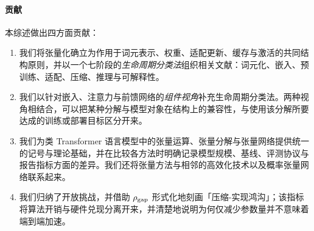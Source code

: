 \documentclass[11pt]{article}
\begin{document}
\paragraph{贡献}
本综述做出四方面贡献：
\begin{enumerate}[leftmargin=*]
  \item 我们将张量化确立为作用于词元表示、权重、适配更新、缓存与激活的共同结构原则，并以一个七阶段的\emph{生命周期分类法}组织相关文献：词元化、嵌入、预训练、适配、压缩、推理与可解释性。
  \item 我们以针对嵌入、注意力与前馈网络的\emph{组件视角}补充生命周期分类法。两种视角相结合，可以把某种分解与模型对象在结构上的兼容性，与使用该分解所要达成的训练或部署目标区分开来。
  \item 我们为类 Transformer 语言模型中的张量运算、张量分解与张量网络提供统一的记号与理论基础，并在比较各方法时明确记录模型规模、基线、评测协议与报告指标方面的差异。我们还将张量方法与相邻的高效化技术以及概率张量网络联系起来。
  \item 我们归纳了开放挑战，并借助 $\rho_{\rm gap}$ 形式化地刻画「压缩-实现鸿沟」；该指标将算法开销与硬件兑现分离开来，并清楚地说明为何仅减少参数量并不意味着端到端加速。
\end{enumerate}

\end{document}
